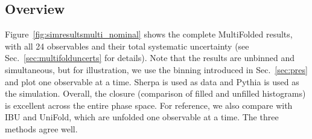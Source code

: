 \label{sec:resultsMulti}

\subsection{Overview}

Figure~\ref{fig:simresultsmulti_nominal} shows the complete MultiFolded results, with all 24 observables and their total systematic uncertainty (see Sec.~\ref{sec:multifolduncerts} for details).  Note that the results are unbinned and simultaneous, but for illustration, we use the binning introduced in Sec.~\ref{sec:pres} and plot one observable at a time.  Sherpa is used as data and Pythia is used as the simulation.  Overall, the closure (comparison of filled and unfilled histograms) is excellent across the entire phase space.  For reference, we also compare with IBU and UniFold, which are unfolded one observable at a time.  The three methods agree well.


